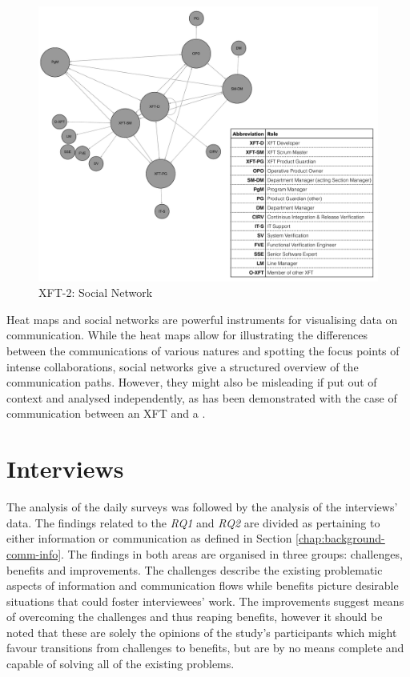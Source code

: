 \begin{figure}[h!]
  \centering
  \includegraphics[width=1\textwidth]{figures/sn/sn-picnic-legend.pdf}
  \caption{XFT-2: Social Network}
  \label{fig:picnic-sn}
\end{figure}

Heat maps and social networks are powerful instruments for visualising data on communication. While the heat maps allow for illustrating the differences between the communications of various natures and spotting the focus points of intense collaborations, social networks give a structured overview of the communication paths. However, they might also be misleading if put out of context and analysed independently, as has been demonstrated with the case of communication between an XFT and a .

\section{Interviews}

The analysis of the daily surveys was followed by the analysis of the interviews' data.
The findings related to the \textit{RQ1} and \textit{RQ2} are divided as pertaining to either information or communication as defined in Section \ref{chap:background-comm-info}.
The findings in both areas are organised in three groups: challenges, benefits and improvements. The challenges describe the existing problematic aspects of information and communication flows while benefits picture desirable situations that could foster interviewees' work. The improvements suggest means of overcoming the challenges and thus reaping benefits, however it should be noted that these are solely the opinions of the study's participants which might favour transitions from challenges to benefits, but are by no means complete and capable of solving all of the existing problems.

